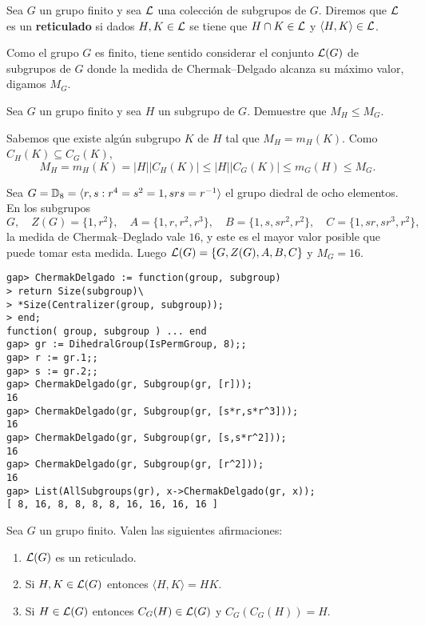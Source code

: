 Sea $G$ un grupo finito y sea $\mathcal{L}$ una colección de subgrupos de $G$. Diremos
que $\mathcal{L}$ es un \textbf{reticulado} si dados $H,K\in\mathcal{L}$ se tiene que $H\cap
K\in\mathcal{L}$ y $\langle H,K\rangle\in\mathcal{L}$. 

Como el grupo $G$ es finito, tiene sentido considerar el conjunto $\mathcal{L}(G)$ de
subgrupos de $G$ donde la medida de Chermak--Delgado alcanza su máximo valor,
digamos $M_G$. 

\begin{exercise}
	\label{exercise:M_S}
	Sea $G$ un grupo finito y sea $H$ un subgrupo de $G$. Demuestre que
	$M_H\leq M_G$.
\end{exercise}

\begin{svgraybox}
	Sabemos que existe algún subgrupo $K$ de $H$ tal que $M_H=m_H(K)$. Como
	$C_H(K)\subseteq C_G(K)$, 
	\[
		M_H=m_H(K)=|H||C_H(K)|\leq |H||C_G(K)|\leq m_G(H)\leq M_G.
	\]
\end{svgraybox}

\begin{example}
	\label{example:D8_CD}
	Sea $G=\mathbb{D}_8=\langle r,s:r^4=s^2=1,srs=r^{-1}\rangle$ el grupo diedral de
	ocho elementos. En los subgrupos
	\[
		G,
		\quad
		Z(G)=\{1,r^2\},\quad
		A=\{1,r,r^2,r^3\},\quad
		B=\{1, s,sr^2,r^2\},\quad
		C=\{1,sr,sr^3,r^2\},
	\]
	la medida de Chermak--Deglado vale $16$, y este es el mayor valor posible
	que puede tomar esta medida. Luego $\mathcal{L}(G)=\{G,Z(G),A,B,C\}$ y $M_G=16$. 
	\begin{lstlisting}
gap> ChermakDelgado := function(group, subgroup)
> return Size(subgroup)\
> *Size(Centralizer(group, subgroup));
> end;
function( group, subgroup ) ... end
gap> gr := DihedralGroup(IsPermGroup, 8);;
gap> r := gr.1;;
gap> s := gr.2;;
gap> ChermakDelgado(gr, Subgroup(gr, [r]));
16
gap> ChermakDelgado(gr, Subgroup(gr, [s*r,s*r^3]));
16
gap> ChermakDelgado(gr, Subgroup(gr, [s,s*r^2]));
16
gap> ChermakDelgado(gr, Subgroup(gr, [r^2]));
16
gap> List(AllSubgroups(gr), x->ChermakDelgado(gr, x));
[ 8, 16, 8, 8, 8, 8, 16, 16, 16, 16 ]
	\end{lstlisting}
\end{example}

\begin{theorem}
	Sea $G$ un grupo finito. 
	Valen las siguientes afirmaciones:
	\begin{enumerate}
		\item $\mathcal{L}(G)$ es un reticulado. 
		\item Si $H,K\in\mathcal{L}(G)$ entonces $\langle H,K\rangle=HK$.
		\item Si $H\in\mathcal{L}(G)$ entonces $C_G(H)\in\mathcal{L}(G)$ y $C_G(C_G(H))=H$.
	\end{enumerate}
	\label{theorem:reticulado}
\end{theorem}

